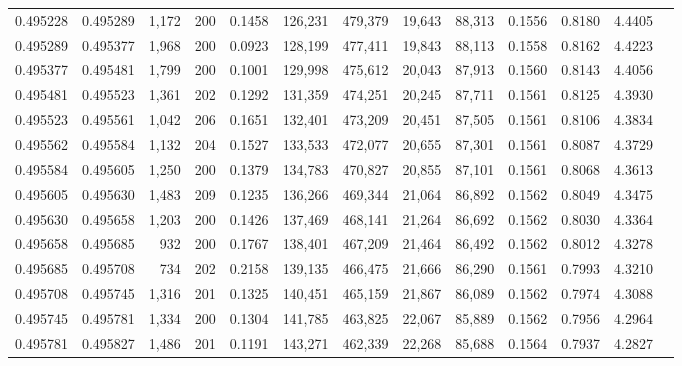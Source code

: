 \begin{tabular}{rrrrrrrrrrrrr}
0.495228 & 0.495289 & 1,172 & 200 &                                     0.1458 & 126,231 & 479,379 &  19,643 &  88,313 & 0.1556 & 0.8180 & 4.4405 \\
0.495289 & 0.495377 & 1,968 & 200 &                                     0.0923 & 128,199 & 477,411 &  19,843 &  88,113 & 0.1558 & 0.8162 & 4.4223 \\
0.495377 & 0.495481 & 1,799 & 200 &                                     0.1001 & 129,998 & 475,612 &  20,043 &  87,913 & 0.1560 & 0.8143 & 4.4056 \\
0.495481 & 0.495523 & 1,361 & 202 &                                     0.1292 & 131,359 & 474,251 &  20,245 &  87,711 & 0.1561 & 0.8125 & 4.3930 \\
0.495523 & 0.495561 & 1,042 & 206 &                                     0.1651 & 132,401 & 473,209 &  20,451 &  87,505 & 0.1561 & 0.8106 & 4.3834 \\
0.495562 & 0.495584 & 1,132 & 204 &                                     0.1527 & 133,533 & 472,077 &  20,655 &  87,301 & 0.1561 & 0.8087 & 4.3729 \\
0.495584 & 0.495605 & 1,250 & 200 &                                     0.1379 & 134,783 & 470,827 &  20,855 &  87,101 & 0.1561 & 0.8068 & 4.3613 \\
0.495605 & 0.495630 & 1,483 & 209 &                                     0.1235 & 136,266 & 469,344 &  21,064 &  86,892 & 0.1562 & 0.8049 & 4.3475 \\
0.495630 & 0.495658 & 1,203 & 200 &                                     0.1426 & 137,469 & 468,141 &  21,264 &  86,692 & 0.1562 & 0.8030 & 4.3364 \\
0.495658 & 0.495685 &   932 & 200 &                                     0.1767 & 138,401 & 467,209 &  21,464 &  86,492 & 0.1562 & 0.8012 & 4.3278 \\
0.495685 & 0.495708 &   734 & 202 &                                     0.2158 & 139,135 & 466,475 &  21,666 &  86,290 & 0.1561 & 0.7993 & 4.3210 \\
0.495708 & 0.495745 & 1,316 & 201 &                                     0.1325 & 140,451 & 465,159 &  21,867 &  86,089 & 0.1562 & 0.7974 & 4.3088 \\
0.495745 & 0.495781 & 1,334 & 200 &                                     0.1304 & 141,785 & 463,825 &  22,067 &  85,889 & 0.1562 & 0.7956 & 4.2964 \\
0.495781 & 0.495827 & 1,486 & 201 &                                     0.1191 & 143,271 & 462,339 &  22,268 &  85,688 & 0.1564 & 0.7937 & 4.2827 \\

\end{tabular}
